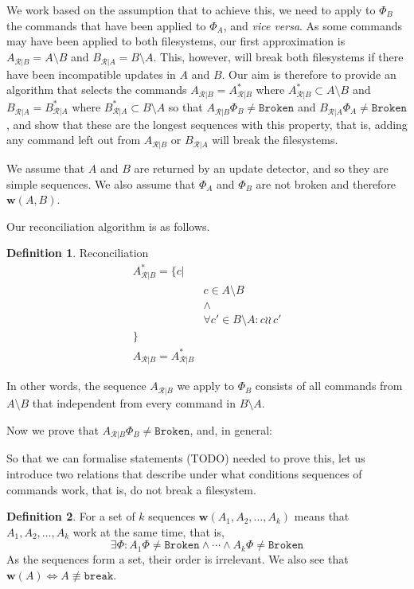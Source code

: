 \documentclass[12pt]{article}
\newcommand{\fsbroken}{\mathtt{Broken}} %
\newcommand{\FS}{\Phi} %
\newcommand{\cbrk}{\mathtt{break}}
\newcommand{\nequiv}{\not\equiv}
\newcommand{\indep}{\wr\!\!\wr\,} %
\newcommand{\works}[1]{{\mathbf{w}}({#1})}
\newcommand{\ordered}[1]{#1}
\newcommand{\recchar}[3]{{#1}^{#3}_{\mathcal{R}|{#2}}}
\newcommand{\reca}{\recchar{A}{B}{}} %
\newcommand{\recb}{\recchar{B}{A}{}}
\newcommand{\recaset}{\recchar{A}{B}{*}}
\newcommand{\recbset}{\recchar{B}{A}{*}}
\theoremstyle{definition}
\newtheorem{mydef}{Definition}
\begin{document}
We work based on the assumption that to achieve this, we need
to apply to $\FS_B$ the commands that have been applied to $\FS_A$, and \emph{vice versa}.
As some commands may have been applied to both filesystems, our first approximation
is $\reca = \ordered{A\setminus B}$ and $\recb = \ordered{B\setminus A}$.
This, however, will break both filesystems if there have been incompatible updates
in $A$ and $B$. 
Our aim is therefore to provide an algorithm that selects the commands 
$\reca = \ordered{\recaset}$  where $\recaset \subset A\setminus B$
and $\recb = \ordered{\recbset}$ where $\recbset \subset B\setminus A$ 
so that $\reca\FS_B\neq\fsbroken$ and $\recb\FS_A\neq\fsbroken$,
and show that these are the longest sequences with this property, that is,
adding any command left out from $\reca$ or $\recb$ will break the filesystems.

We assume that $A$ and $B$ are returned by an update detector,
and so they are simple sequences.
We also assume that $\FS_A$ and $\FS_B$ are not broken and therefore $\works{A,B}$.

Our reconciliation algorithm is as follows.

\begin{mydef}{Reconciliation}\label{def:reconciliation}
\begin{align*}
\recaset = \{c| & \\
& c\in A\setminus B \\
& \wedge \\
& \forall c'\in B\setminus A: c\indep c'\\
\} & \\
\reca = \ordered{\recaset}&
\end{align*}

In other words, the sequence $\reca$ we apply to $\FS_B$ consists of all commands from $A\setminus B$
that independent from every command in $B\setminus A$.
\end{mydef}

Now we prove that $\reca\FS_B\neq\fsbroken$, and, in general:









So that we can formalise statements (TODO) needed to prove this,
let us introduce two relations that describe under what conditions
sequences of commands work, that is, do not break a filesystem.

\begin{mydef}
For a set of $k$ sequences
$\works{A_1,A_2,\ldots,A_k}$ means that 
$A_1,A_2,\ldots,A_k$ work at the same time, that is,
\[\exists \FS: A_1\FS\neq\fsbroken \wedge \cdots \wedge A_k\FS\neq\fsbroken\]
As the sequences form a set, their order is irrelevant.
We also see that $\works{A} \Leftrightarrow A\nequiv \cbrk$. 
\end{mydef}
\end{document}
